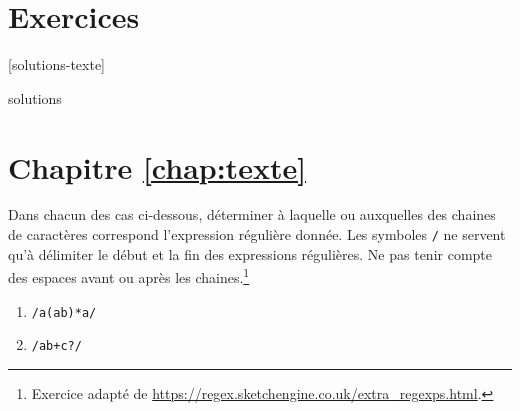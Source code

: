 \section{Exercices}
\label{sec:texte:exercices}

[solutions-texte]

\begin{Filesave}{solutions}
\section*{Chapitre \ref*{chap:texte}}

\end{Filesave}


\begin{exercice}
  Dans chacun des cas ci-dessous, déterminer à laquelle ou auxquelles
  des chaines de caractères correspond l'expression régulière donnée.
  Les symboles \verb=/= ne servent qu'à délimiter le début et la fin
  des expressions régulières. Ne pas tenir compte des espaces avant ou
  après les chaines.\footnote{%
    Exercice adapté de
    \url{https://regex.sketchengine.co.uk/extra_regexps.html}.}
  \begin{enumerate}
    \setlength{\multicolsep}{2pt}
  \item \verb~/a(ab)*a/~
    \begin{enumerate}[1)]
    \end{enumerate}
  \item \verb~/ab+c?/~
    \begin{enumerate}[1)]
      \begin{multicols}{3}

\end{multicols}
\end{enumerate}
\end{enumerate}
\end{exercice}

